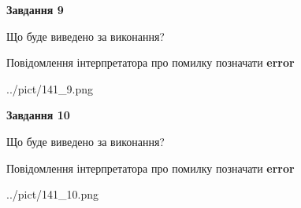 \documentclass[12pt, ukrainian]{article}
\begin{document}
{{\begin {center}\textbf{Завдання 9}\end {center}}\par
Що буде виведено за виконання? \par
Повідомлення інтерпретатора про помилку позначати \textbf{error}

\begin{center}
	{../pict/141_9.png}
\end{center}
\newpage

{\begin {center}\textbf{Завдання 10}\end {center}}\par
Що буде виведено за виконання? \par
Повідомлення інтерпретатора про помилку позначати \textbf{error}

\begin{center}
	{../pict/141_10.png}
\end{center}
\newpage

}
\end{document}
